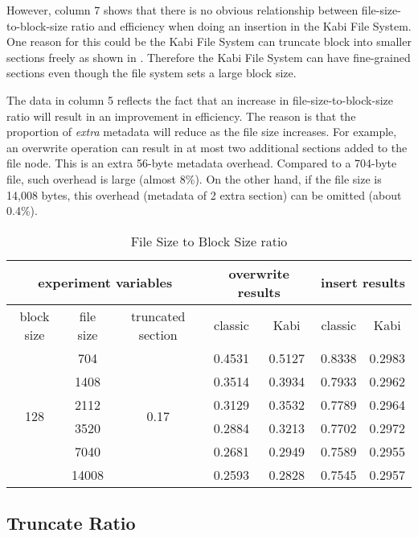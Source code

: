     However, column 7 shows that there is no obvious relationship between file-size-to-block-size ratio and efficiency when doing an insertion in the Kabi File System. One reason for this could be the Kabi File System can truncate block into smaller sections freely as shown in . Therefore the Kabi File System can have fine-grained sections even though the file system sets a large block size.
    
    The data in column 5 reflects the fact that an increase in file-size-to-block-size ratio will result in an improvement in efficiency. The reason is that the proportion of \emph{extra} metadata will reduce as the file size increases. For example, an overwrite operation can result in at most two additional sections added to the file node. This is an extra 56-byte metadata overhead. Compared to a 704-byte file, such overhead is large (almost 8\%). On the other hand, if the file size is 14,008 bytes, this overhead (metadata of 2 extra section) can be omitted (about 0.4\%).

\begin{table}[t]
\begin{center}
\begin{tabular}{|c|c|c|cccc|}
\hline
\multicolumn{3}{|c|}{experiment variables} & \multicolumn{2}{c|}{overwrite results} & \multicolumn{2}{c|}{insert results}\\
\hline
block size & file size & truncated section & \multicolumn{1}{c|}{classic} & \multicolumn{1}{c|}{Kabi} & \multicolumn{1}{c|}{classic} & Kabi\\
\hline
\multirow{6}{*}{128} & 704 & \multirow{6}{*}{0.17} & 0.4531 & 0.5127 & 0.8338 & 0.2983 \\
& 1408 & & 0.3514 & 0.3934 & 0.7933 & 0.2962 \\
& 2112 & & 0.3129 & 0.3532 & 0.7789 & 0.2964 \\
& 3520 & & 0.2884 & 0.3213 & 0.7702 & 0.2972 \\
& 7040 & & 0.2681 & 0.2949 & 0.7589 & 0.2955 \\
& 14008 & & 0.2593 & 0.2828 & 0.7545 & 0.2957 \\
\hline
\end{tabular}
\end{center}
\caption{File Size to Block Size ratio}
\label{tab:fb_ratio}
\end{table}

\subsection{Truncate Ratio}

